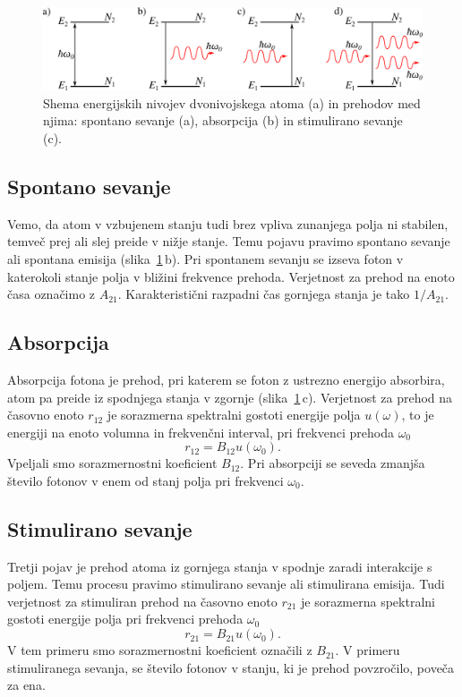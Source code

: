 \begin{figure}[h]
\centering
\includegraphics[width=14truecm]{slike/05_Dvonivojski.png}
\caption{Shema energijskih nivojev dvonivojskega atoma (a) in prehodov med njima:
spontano sevanje (a), absorpcija (b) in stimulirano sevanje (c).}
\label{sl4.1}
\end{figure}

\subsection*{Spontano sevanje}
Vemo, da atom v vzbujenem stanju tudi brez vpliva zunanjega polja
ni stabilen, temveč prej ali slej preide v nižje stanje. Temu pojavu
pravimo spontano sevanje ali spontana emisija (slika~\ref{sl4.1}\,b). 
Pri spontanem sevanju se izseva foton v katerokoli stanje polja v bližini 
frekvence prehoda. Verjetnost za prehod na enoto časa označimo z $A_{21}$.
Karakteristični razpadni čas gornjega stanja je tako
$1/A_{21}$.

\subsection*{Absorpcija}
Absorpcija fotona je prehod, pri katerem se foton 
z ustrezno energijo absorbira, atom pa preide iz spodnjega stanja v zgornje (slika~\ref{sl4.1}\,c). 
Verjetnost za prehod na časovno enoto $r_{12}$ je sorazmerna spektralni gostoti
energije polja $u(\omega)$, to je energiji na enoto volumna in frekvenčni interval, 
pri frekvenci prehoda $\omega_{0}$
\begin{equation}
r_{12}=B_{12}u(\omega_{0}).
\label{4.16}
\end{equation}
Vpeljali smo sorazmernostni koeficient $B_{12}$. Pri absorpciji se
seveda zmanjša število fotonov v enem od stanj polja pri frekvenci
$\omega_{0}$.

\subsection*{Stimulirano sevanje}
Tretji pojav je prehod atoma iz gornjega stanja v spodnje zaradi interakcije
s poljem. Temu procesu pravimo stimulirano sevanje ali 
stimulirana emisija. Tudi verjetnost za stimuliran prehod na časovno enoto $r_{21}$ 
je sorazmerna spektralni gostoti energije polja pri frekvenci prehoda $\omega_{0}$
\begin{equation}
r_{21}=B_{21}u(\omega_{0}).
\label{4.17}
\end{equation}
V tem primeru smo sorazmernostni koeficient označili z $B_{21}$. V primeru
stimuliranega sevanja, se število fotonov v stanju, ki je prehod povzročilo, poveča za ena. 

